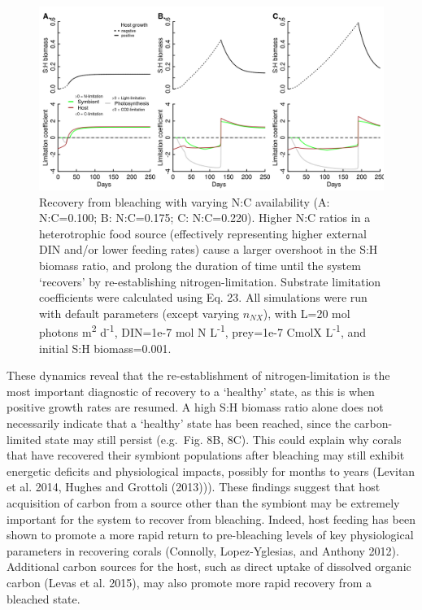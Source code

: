 \documentclass[]{elsarticle} %
\makeatletter
\def\maxwidth{\ifdim\Gin@nat@width>\linewidth\linewidth
\else\Gin@nat@width\fi}
\let\Oldincludegraphics\includegraphics
\renewcommand{\includegraphics}[1]{\Oldincludegraphics[width=\maxwidth]{#1}}
\makeatother
\begin{document}
\begin{figure}[htbp]
\centering
\includegraphics{../img/Fig8.png}
\caption{Recovery from bleaching with varying N:C availability (A:
N:C=0.100; B: N:C=0.175; C: N:C=0.220). Higher N:C ratios in a
heterotrophic food source (effectively representing higher external DIN
and/or lower feeding rates) cause a larger overshoot in the S:H biomass
ratio, and prolong the duration of time until the system `recovers' by
re-establishing nitrogen-limitation. Substrate limitation coefficients
were calculated using Eq. 23. All simulations were run with default
parameters (except varying \(n_{NX}\)), with L=20 mol photons
m\textsuperscript{2} d\textsuperscript{-1}, DIN=1e-7 mol N
L\textsuperscript{-1}, prey=1e-7 CmolX L\textsuperscript{-1}, and
initial S:H biomass=0.001.}
\end{figure}

These dynamics reveal that the re-establishment of nitrogen-limitation
is the most important diagnostic of recovery to a `healthy' state, as
this is when positive growth rates are resumed. A high S:H biomass ratio
alone does not necessarily indicate that a `healthy' state has been
reached, since the carbon-limited state may still persist (e.g.~Fig. 8B,
8C). This could explain why corals that have recovered their symbiont
populations after bleaching may still exhibit energetic deficits and
physiological impacts, possibly for months to years (Levitan et al.
2014, Hughes and Grottoli (2013))). These findings suggest that host
acquisition of carbon from a source other than the symbiont may be
extremely important for the system to recover from bleaching. Indeed,
host feeding has been shown to promote a more rapid return to
pre-bleaching levels of key physiological parameters in recovering
corals (Connolly, Lopez-Yglesias, and Anthony 2012). Additional carbon
sources for the host, such as direct uptake of dissolved organic carbon
(Levas et al. 2015), may also promote more rapid recovery from a
bleached state.
\end{document}
